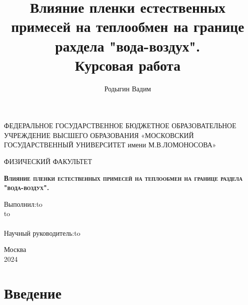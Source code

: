 \documentclass[a4paper, 14pt]{extarticle}
\title{%
  Влияние пленки естественных примесей на теплообмен на границе рахдела "вода-воздух". \\
  \large Курсовая работа}
\author{Родыгин Вадим}
\begin{document}
\begin{titlepage}
\newpage
\begin{center}
ФЕДЕРАЛЬНОЕ ГОСУДАРСТВЕННОЕ БЮДЖЕТНОЕ ОБРАЗОВАТЕЛЬНОЕ УЧРЕЖДЕНИЕ ВЫСШЕГО ОБРАЗОВАНИЯ «МОСКОВСКИЙ ГОСУДАРСТВЕННЫЙ УНИВЕРСИТЕТ имени М.В.ЛОМОНОСОВА» \\
\end{center}
\begin{center}
ФИЗИЧЕСКИЙ ФАКУЛЬТЕТ \\ 
\end{center}
\vspace{4em}
\begin{center}
\Large\textsc{\textbf{Влияние пленки естественных примесей на теплообмен на границе раздела "вода-воздух".}}
\end{center}
\vspace{6em}
\newbox{\lbox}
\newlength{\maxl}
\setlength{\maxl}{\wd\lbox}
\hfill\parbox{13cm}{
\hspace*{5cm}\hspace*{-5cm}Выполнил:\hfill\hbox to\\
\hspace*{5cm}\hspace*{-5cm} \hfill\hbox to\\
\\
\hspace*{5cm}\hspace*{-5cm}Научный руководитель:\hfill\hbox to\\
}
\vspace{\fill}
\begin{center}
Москва \\2024
\end{center}
\end{titlepage}

\newpage
{}
\vspace*{6em}
\tableofcontents %
\vspace*{\fill}
\newpage


\section*{Введение}
\end{document}
